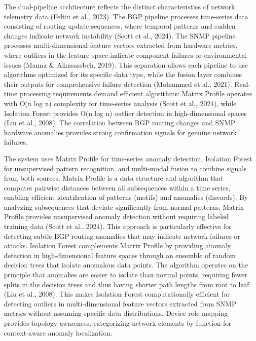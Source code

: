\documentclass[11pt]{article}
\begin{document}
The dual-pipeline architecture reflects the distinct characteristics of network telemetry data (Feltin et al., 2023). The BGP pipeline processes time-series data consisting of routing update sequences, where temporal patterns and sudden changes indicate network instability (Scott et al., 2024). The SNMP pipeline processes multi-dimensional feature vectors extracted from hardware metrics, where outliers in the feature space indicate component failures or environmental issues (Manna \& Alkasassbeh, 2019). This separation allows each pipeline to use algorithms optimized for its specific data type, while the fusion layer combines their outputs for comprehensive failure detection (Mohammed et al., 2021). Real-time processing requirements demand efficient algorithms: Matrix Profile operates with O(n log n) complexity for time-series analysis (Scott et al., 2024), while Isolation Forest provides O(n log n) outlier detection in high-dimensional spaces (Liu et al., 2008). The correlation between BGP routing changes and SNMP hardware anomalies provides strong confirmation signals for genuine network failures.

The system uses Matrix Profile for time-series anomaly detection, Isolation Forest for unsupervised pattern recognition, and multi-modal fusion to combine signals from both sources. Matrix Profile is a data structure and algorithm that computes pairwise distances between all subsequences within a time series, enabling efficient identification of patterns (motifs) and anomalies (discords). By analyzing subsequences that deviate significantly from normal patterns, Matrix Profile provides unsupervised anomaly detection without requiring labeled training data (Scott et al., 2024). This approach is particularly effective for detecting subtle BGP routing anomalies that may indicate network failures or attacks. Isolation Forest complements Matrix Profile by providing anomaly detection in high-dimensional feature spaces through an ensemble of random decision trees that isolate anomalous data points. The algorithm operates on the principle that anomalies are easier to isolate than normal points, requiring fewer splits in the decision trees and thus having shorter path lengths from root to leaf (Liu et al., 2008). This makes Isolation Forest computationally efficient for detecting outliers in multi-dimensional feature vectors extracted from SNMP metrics without assuming specific data distributions. Device role mapping provides topology awareness, categorizing network elements by function for context-aware anomaly localization.
\end{document}
